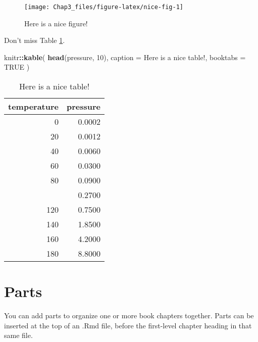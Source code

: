 \documentclass[
]{report}
\newenvironment{Shaded}{\begin{snugshade}}{\end{snugshade}}
\newcommand{\AttributeTok}[1]{\textcolor[rgb]{0.13,0.29,0.53}{#1}}
\newcommand{\ConstantTok}[1]{\textcolor[rgb]{0.56,0.35,0.01}{#1}}
\newcommand{\DecValTok}[1]{\textcolor[rgb]{0.00,0.00,0.81}{#1}}
\newcommand{\FunctionTok}[1]{\textcolor[rgb]{0.13,0.29,0.53}{\textbf{#1}}}
\newcommand{\NormalTok}[1]{#1}
\newcommand{\SpecialCharTok}[1]{\textcolor[rgb]{0.81,0.36,0.00}{\textbf{#1}}}
\newcommand{\StringTok}[1]{\textcolor[rgb]{0.31,0.60,0.02}{#1}}
\theoremstyle{definition}
\theoremstyle{definition}
\theoremstyle{definition}
\theoremstyle{definition}
\theoremstyle{remark}
\begin{document}
\begin{figure}

{\centering \texttt{[image: Chap3\_files/figure-latex/nice-fig-1]} 

}

\caption{Here is a nice figure!}\label{fig:nice-fig}
\end{figure}

Don't miss Table \ref{tab:nice-tab}.

\begin{Shaded}
\begin{Highlighting}[]
\NormalTok{knitr}\SpecialCharTok{::}\FunctionTok{kable}\NormalTok{(}
  \FunctionTok{head}\NormalTok{(pressure, }\DecValTok{10}\NormalTok{), }\AttributeTok{caption =} \StringTok{\textquotesingle{}Here is a nice table!\textquotesingle{}}\NormalTok{,}
  \AttributeTok{booktabs =} \ConstantTok{TRUE}
\NormalTok{)}
\end{Highlighting}
\end{Shaded}

\begin{table}

\caption{\label{tab:nice-tab}Here is a nice table!}
\centering
\begin{tabular}[t]{rr}
\toprule
temperature & pressure\\
\midrule
0 & 0.0002\\
20 & 0.0012\\
40 & 0.0060\\
60 & 0.0300\\
80 & 0.0900\\
\addlinespace
100 & 0.2700\\
120 & 0.7500\\
140 & 1.8500\\
160 & 4.2000\\
180 & 8.8000\\
\bottomrule
\end{tabular}
\end{table}

\hypertarget{parts}{%
\chapter{Parts}\label{parts}}

You can add parts to organize one or more book chapters together. Parts can be inserted at the top of an .Rmd file, before the first-level chapter heading in that same file.
\end{document}
